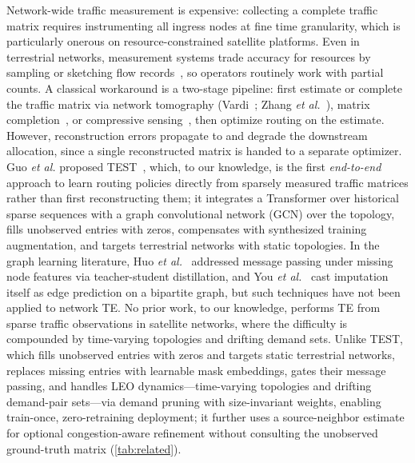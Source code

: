 Network-wide traffic measurement is expensive: collecting a complete
traffic matrix requires instrumenting all ingress nodes at fine time
granularity, which is particularly onerous on resource-constrained
satellite platforms. Even in terrestrial networks, measurement systems
trade accuracy for resources by sampling or sketching flow
records~\cite{estan2002,liu2016}, so operators routinely work with partial
counts. A classical workaround is a two-stage pipeline:
first estimate or complete the traffic matrix via network tomography
(Vardi~\cite{vardi1996}; Zhang \emph{et al.}~\cite{zhang2003}), matrix
completion~\cite{candes2009}, or compressive sensing~\cite{zhang2009}, then
optimize routing on
the estimate. However, reconstruction errors propagate to and degrade the
downstream allocation, since a single reconstructed matrix is handed to a
separate optimizer. Guo \emph{et al.} proposed TEST~\cite{test}, which, to
our knowledge, is the first \emph{end-to-end} approach to learn routing
policies directly from sparsely measured traffic matrices rather than first
reconstructing them; it integrates a Transformer over historical sparse
sequences with a graph convolutional network (GCN) over the topology, fills
unobserved entries with zeros, compensates with synthesized training
augmentation, and targets terrestrial networks with static topologies. In the
graph learning literature, Huo \emph{et al.}~\cite{t2gnn} addressed message
passing under missing node features via teacher-student distillation, and You
\emph{et al.}~\cite{you2020} cast imputation itself as edge prediction on a
bipartite graph, but such
techniques have not been applied to network TE. No prior work, to our
knowledge, performs TE from sparse traffic observations in satellite networks,
where the difficulty is compounded by time-varying topologies and drifting
demand sets. Unlike TEST, which fills unobserved entries with zeros and
targets static terrestrial networks, \sysname{} replaces missing entries with
learnable mask embeddings, gates their message passing, and handles LEO
dynamics---time-varying topologies and drifting demand-pair sets---via demand
pruning with size-invariant weights, enabling train-once, zero-retraining
deployment; it further uses a source-neighbor estimate for optional
congestion-aware refinement without consulting the unobserved ground-truth
matrix (\cref{tab:related}).

